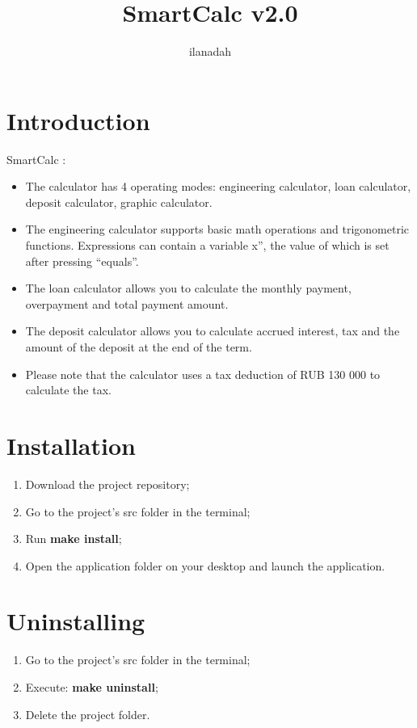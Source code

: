 \documentclass{article}
\title{SmartCalc v2.0}
\author{ilanadah}
\begin{document}
\maketitle

\section{Introduction}
    SmartCalc :
    \begin{itemize}
        \item The calculator has 4 operating modes: engineering calculator, loan calculator, deposit calculator, graphic calculator.
        \item The engineering calculator supports basic math operations and trigonometric functions. Expressions can contain a variable
        x”, the value of which is set after pressing “equals”.
        \item The loan calculator allows you to calculate the monthly payment, overpayment and total payment amount.
        \item The deposit calculator allows you to calculate accrued interest, tax and the amount of the deposit at the end of the term.
        \item Please note that the calculator uses a tax deduction of RUB 130 000 to calculate the tax.
    \end{itemize}

\section{Installation}

\begin{enumerate}
    \item Download the project repository;
    \item Go to the project's src folder in the terminal;
    \item Run \textbf{make install};
    \item Open the application folder on your desktop and launch the application.
\end{enumerate}

\section{Uninstalling}

\begin{enumerate}
    \item Go to the project's src folder in the terminal;
    \item Execute: \textbf{make uninstall};
    \item Delete the project folder.
\end{enumerate}
\end{document}
